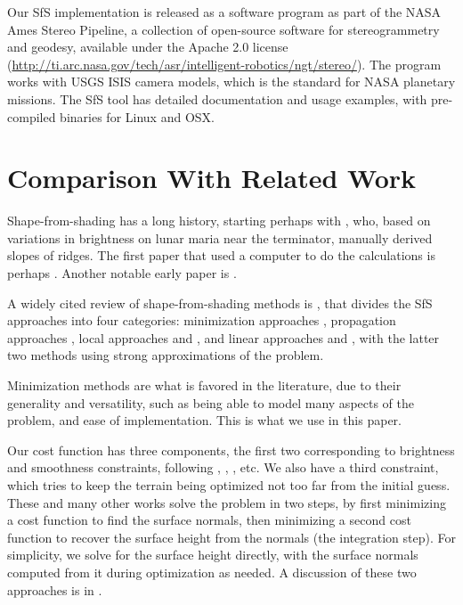 \documentclass[12pt,oneside]{article}
\begin{document}
Our SfS implementation is released as a software program as part of the
NASA Ames Stereo Pipeline, a collection of open-source software for
stereogrammetry and geodesy, available under the Apache 2.0 license
(\url{http://ti.arc.nasa.gov/tech/asr/intelligent-robotics/ngt/stereo/}). The
program works with USGS ISIS camera models, which is the standard for
NASA planetary missions. The SfS tool has detailed documentation and
usage examples, with pre-compiled binaries for Linux and OSX.

\section{Comparison With Related Work}
\label{comp}


Shape-from-shading has a long history, starting perhaps with
\citep{van1951photometric}, who, based on variations in brightness on
lunar maria near the terminator, manually derived slopes of ridges.
The first paper that used a computer to do the calculations is perhaps
\citep{rindfleisch1966photometric}. Another notable early paper is \cite{Kirk:1977fk}.


A widely cited review of shape-from-shading methods is
\cite{zhang1999shape}, that divides the SfS approaches into four
categories: minimization approaches \cite{ikeuchi1981numerical},
propagation approaches \cite{horn1970shape}, local approaches
\cite{pentland1984local} and \cite{lee1985improved}, and linear approaches
\cite{pentland1989shape} and \cite{tsai1992fast}, with the latter two
methods using strong approximations of the problem.

Minimization methods are what is favored in the literature, due to their
generality and versatility, such as being able to model many aspects of
the problem, and ease of implementation. This is what we use in this
paper.

Our cost function has three components, the first two corresponding to brightness and
smoothness constraints, following \cite{ikeuchi1981numerical},
\cite{horn1990height}, \cite{lee1993shape}, etc. We also have a third constraint,
which tries to keep the terrain being optimized not too far from the initial guess. 
These and many other
works solve the problem in two steps, by first minimizing a cost
function to find the surface normals, then minimizing a second cost
function to recover the surface height from the normals (the integration
step).  For simplicity, we solve for the surface height directly, with
the surface normals computed from it during optimization as needed. A
discussion of these two approaches is in
\cite{crouzil2003multiresolution}.
\end{document}
